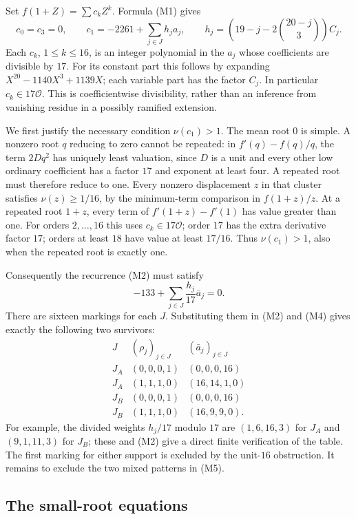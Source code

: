 \documentclass[
  british,
  10pt,
  a4paper,
]{article}
\begin{document}
Set \(f(1+Z)=\sum c_kZ^k\). Formula (M1) gives \[
c_0=c_3=0,\qquad
c_1=-2261+\sum_{j\in J}h_ja_j,\qquad
h_j=\left(19-j-2\binom{20-j}{3}\right)C_j.                       \tag{M3}
\] Each \(c_k\), \(1\leq k\leq16\), is an integer polynomial in the
\(a_j\) whose coefficients are divisible by \(17\). For its constant
part this follows by expanding \(X^{20}-1140X^3+1139X\); each variable
part has the factor \(C_j\). In particular \(c_k\in17\mathcal O\). This
is coefficientwise divisibility, rather than an inference from vanishing
residue in a possibly ramified extension.

We first justify the necessary condition \(\nu(c_1)>1\). The mean root
\(0\) is simple. A nonzero root \(q\) reducing to zero cannot be
repeated: in \(f'(q)-f(q)/q\), the term \(2Dq^2\) has uniquely least
valuation, since \(D\) is a unit and every other low ordinary
coefficient has a factor \(17\) and exponent at least four. A repeated
root must therefore reduce to one. Every nonzero displacement \(z\) in
that cluster satisfies \(\nu(z)\geq1/16\), by the minimum-term
comparison in \(f(1+z)/z\). At a repeated root \(1+z\), every term of
\(f'(1+z)-f'(1)\) has value greater than one. For orders \(2,\ldots,16\)
this uses \(c_k\in17\mathcal O\); order \(17\) has the extra derivative
factor \(17\); orders at least \(18\) have value at least \(17/16\).
Thus \(\nu(c_1)>1\), also when the repeated root is exactly one.

Consequently the recurrence (M2) must satisfy \[
-133+\sum_{j\in J}\frac{h_j}{17}\bar a_j=0.                      \tag{M4}
\] There are sixteen markings for each \(J\). Substituting them in (M2)
and (M4) gives exactly the following two survivors: \[
\begin{array}{c|c|c}
J&(\rho_j)_{j\in J}&(\bar a_j)_{j\in J}\\ \hline
J_A&(0,0,0,1)&(0,0,0,16)\\
J_A&(1,1,1,0)&(16,14,1,0)\\
J_B&(0,0,0,1)&(0,0,0,16)\\
J_B&(1,1,1,0)&(16,9,9,0).
\end{array}                                                   \tag{M5}
\] For example, the divided weights \(h_j/17\) modulo \(17\) are
\((1,6,16,3)\) for \(J_A\) and \((9,1,11,3)\) for \(J_B\); these and
(M2) give a direct finite verification of the table. The first marking
for either support is excluded by the unit-\(16\) obstruction. It
remains to exclude the two mixed patterns in (M5).

\subsection{The small-root equations}\label{the-small-root-equations}
\end{document}
